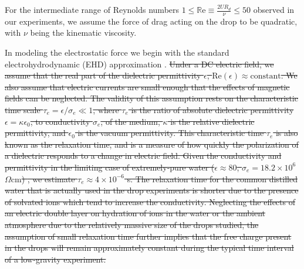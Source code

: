 \documentclass[aip,reprint, floatfix]{revtex4-1}
\begin{document}
For the intermediate range of Reynolds numbers $1 \leq \mathbb{R}\mbox{e} \equiv \frac{2UR_d}{\nu} \leq 50 $ observed in our experiments, we assume the force of drag acting on the drop to be quadratic, with $\nu$ being the kinematic viscosity.

In modeling the electrostatic force we begin with the standard electrohydrodynamic (EHD) approximation \cite{saville_electrohydrodynamics:_1997}. \sout{Under a DC electric field, we assume that the real part of the dielectric permittivity $\epsilon$, $\mbox{Re} \left( \epsilon \right) \approx  \mbox{constant}$. We also assume that electric currents are small enough that the effects of magnetic fields can be neglected. The validity of this assumption rests on the characteristic time scale $\tau_e = \epsilon /\sigma_e \ll 1$, where $\tau_e$ is the ratio of absolute dielectric permittivity $\epsilon = \kappa \epsilon_0$, to conductivity $\sigma_e$, of the medium, $\kappa$ is the relative dielectric permittivity, and $\epsilon_0$ is the vacuum permittivity. This characteristic time $\tau_e$ is also known as the relaxation time, and is a measure of how quickly the polarization of a dielectric responds to a change in electric field. Given the conductivity and permittivity in the limiting case of extremely-pure water ($ \epsilon \approx 80$, $\sigma_e = 18.2 \times 10^{6}$ $\Omega\mbox{cm}$) \cite{yatsuzuka_electrification_1994}, we estimate $\tau_e \approx 4 \times 10^{-6}$ s. The relaxation time for the common distilled water that is actually used in the drop experiments is shorter due to the presence of solvated ions which tend to increase the conductivity. Neglecting the effects of an electric double layer on hydration of ions in the water or the ambient atmosphere due to the relatively massive size of the drops studied, the assumption of small relaxation time further implies that the free charge present in the drops will remain approximately constant during the typical time interval of a low-gravity experiment.}
\end{document}
